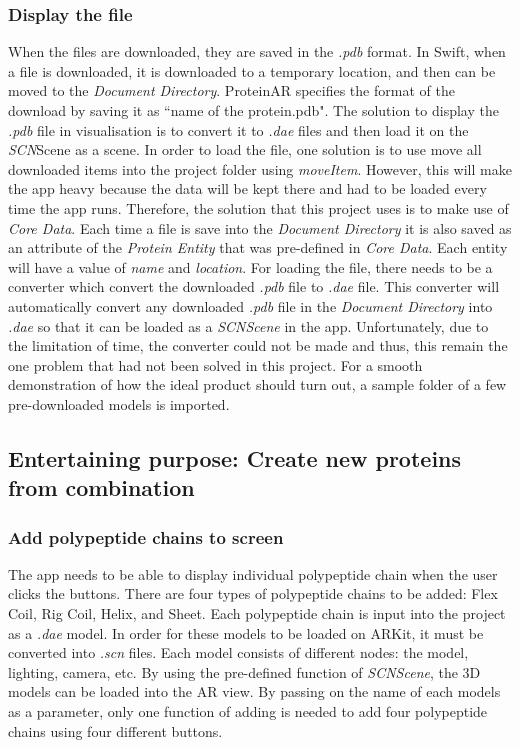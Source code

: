 	\subsubsection{Display the file}
When the 	files are downloaded, they are saved in the \emph{.pdb} format. In Swift, when a file is downloaded, it is downloaded to a temporary location, and then can be moved to the \emph{Document Directory}. ProteinAR specifies the format of the download by saving it as ``name of the protein.pdb". 
The solution to display the \emph{.pdb} file in visualisation is to convert it to \emph{.dae} files and then load it on the \emph{SCN}Scene as a scene. 
In order to load the file, one solution is to use move all downloaded items into the project folder using \emph{moveItem}. However, this will make the app heavy because the data will be kept there and had to be loaded every time the app runs. Therefore, the solution that this project uses is to make use of 
\emph{Core Data}. Each time a file is save into the \emph{Document Directory} it is also saved as an attribute of the \emph{Protein Entity} that was pre-defined in \emph{Core Data}. Each entity will have a value of \emph{name} and \emph{location}.
For loading the file, there needs to be a converter which convert the downloaded \emph{.pdb} file to \emph{.dae} file. This converter will automatically convert any downloaded \emph{.pdb} file in the \emph{Document Directory} into \emph{.dae} so that it can be loaded as a \emph{SCNScene} in the app. 
Unfortunately, due to the limitation of time, the converter could not be made and thus, this remain the one problem that had not been solved in this project. 
For a smooth demonstration of how the ideal product should turn out, a sample folder of a few pre-downloaded models is imported.

 	
\subsection{Entertaining purpose: Create new proteins from combination}
\subsubsection{Add polypeptide chains to screen}
The app needs to be able to display individual polypeptide chain when the user clicks the buttons. There are four types of polypeptide chains to be added: Flex Coil, Rig Coil, Helix, and Sheet. Each polypeptide chain is input into the project as a \emph{.dae} model. In order for these models to be loaded on ARKit, it must be converted into \emph{.scn} files. Each model consists of different nodes: the model, lighting, camera, etc. By using the pre-defined function of \emph{SCNScene}, the 3D models can be loaded into the AR view. By passing on the name of each models as a parameter, only one function of adding is needed to add four polypeptide chains using four different buttons. 

